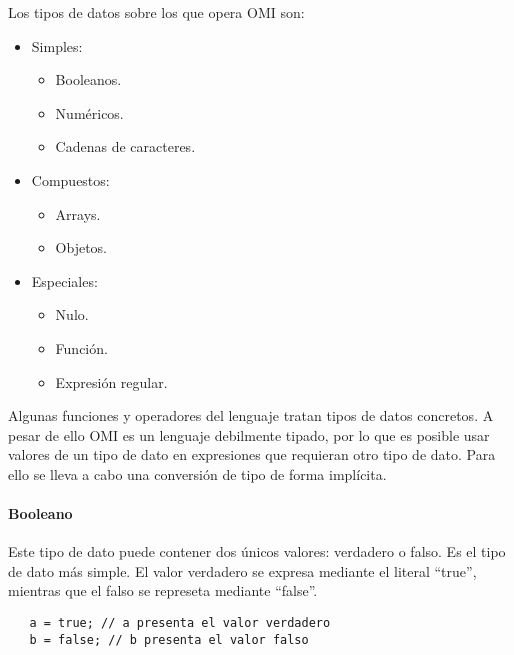 Los tipos de datos sobre los que opera OMI son:
\begin{itemize}
\item Simples:
\begin{itemize}
   \item Booleanos.
   \item Numéricos.
   \item Cadenas de caracteres.
\end{itemize}
\item Compuestos:
\begin{itemize}
   \item Arrays.
   \item Objetos.
\end{itemize}
\item Especiales:
\begin {itemize}
   \item Nulo.
   \item Función.
   \item Expresión regular.
\end{itemize}
\end{itemize}

Algunas funciones y operadores del lenguaje tratan tipos de datos concretos. A pesar de ello OMI es un lenguaje debilmente tipado, por
lo que es posible usar valores de un tipo de dato en expresiones que requieran otro tipo de dato. Para ello se lleva a cabo una conversión de
tipo de forma implícita.

\paragraph{Booleano}\label{sec:type_bool}
Este tipo de dato puede contener dos únicos valores: verdadero o falso. Es el tipo de dato 
más simple. El valor verdadero se expresa mediante el literal ``true'', mientras que el 
falso se represeta mediante ``false''. \\

\begin{lstlisting}
   a = true; // a presenta el valor verdadero
   b = false; // b presenta el valor falso
\end{lstlisting}



